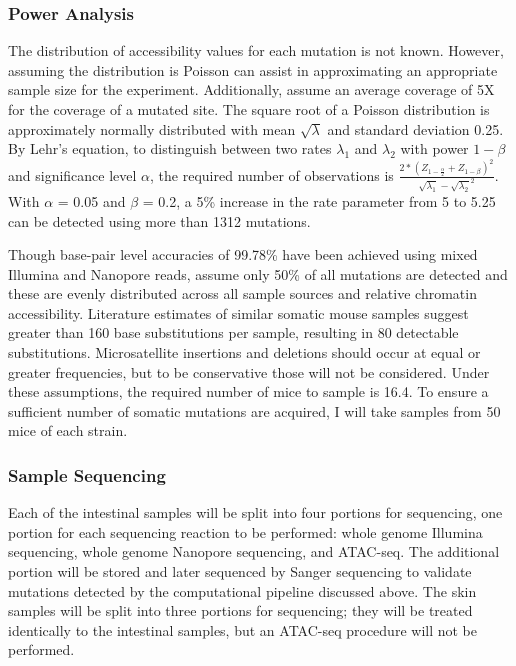 \subsubsection{Power Analysis}

The distribution of accessibility values for each mutation is not known. However, assuming the distribution is Poisson can assist in approximating an appropriate sample size for the experiment. Additionally, assume an average coverage of 5X for the coverage of a mutated site. The square root of a Poisson distribution is approximately normally distributed with mean $\sqrt{\lambda}$ and standard deviation 0.25.
By Lehr's equation, to distinguish between two rates $\lambda_1$ and $\lambda_2$ with power $1 - \beta$ and significance level $\alpha$, the required number of observations is $\frac{2 * (Z_{1 - \frac{\alpha}{2}} + Z_{1 - \beta})^2}{{\sqrt{\lambda_1} - \sqrt{\lambda_2}}^2}$. With $\alpha$ = 0.05 and $\beta$ = 0.2, a 5\% increase in the rate parameter from 5 to 5.25 can be detected using more than 1312 mutations.

Though base-pair level accuracies of 99.78\% have been achieved using mixed Illumina and Nanopore reads, assume only 50\% of all mutations are detected and these are evenly distributed across all sample sources and relative chromatin accessibility. Literature estimates \parencite{behjati_genome_2014} of similar somatic mouse samples suggest greater than 160 base substitutions per sample, resulting in 80 detectable substitutions. Microsatellite insertions and deletions should occur at equal or greater frequencies, but to be conservative those will not be considered. Under these assumptions, the required number of mice to sample is 16.4. To ensure a sufficient number of somatic mutations are acquired, I will take samples from 50 mice of each strain.


\subsubsection{Sample Sequencing}

Each of the intestinal samples will be split into four portions for sequencing, one portion for each sequencing reaction to be performed: whole genome Illumina sequencing, whole genome Nanopore sequencing, and ATAC-seq. The additional portion will be stored and later sequenced by Sanger sequencing to validate mutations detected by the computational pipeline discussed above. The skin samples will be split into three portions for sequencing; they will be treated identically to the intestinal samples, but an ATAC-seq procedure will not be performed.

